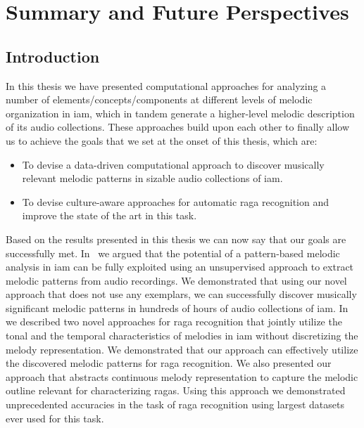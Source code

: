 
\chapter{Summary and Future Perspectives}
\label{sec:summary_future_work}

\section{Introduction}
\label{sec:summary_thesis}

In this thesis we have presented computational approaches for analyzing a number of elements/concepts/components at different levels of melodic organization in \gls{iam}, which in tandem generate a higher-level melodic description of its audio collections. These approaches build upon each other to finally allow us to achieve the goals that we set at the onset of this thesis, which are: 

\begin{itemize}
	\item To devise a data-driven computational approach to discover musically relevant melodic patterns in sizable audio collections of \gls{iam}.
	\item To devise culture-aware approaches for automatic \gls{raga} recognition and improve the state of the art in this task. 
\end{itemize}

Based on the results presented in this thesis we can now say that our goals are successfully met. In~ we argued that the potential of a pattern-based melodic analysis in \gls{iam} can be fully exploited using an unsupervised approach to extract melodic patterns from audio recordings. We demonstrated that using our novel approach that does not use any exemplars, we can successfully discover musically significant melodic patterns in hundreds of hours of audio collections of \gls{iam}. In~ we described two novel approaches for \gls{raga} recognition that jointly utilize the tonal and the temporal characteristics of melodies in \gls{iam} without discretizing the melody representation. We demonstrated that our approach can effectively utilize the discovered melodic patterns for \gls{raga} recognition. We also presented our approach that abstracts continuous melody representation to capture the melodic outline relevant for characterizing \glspl{raga}. Using this approach we demonstrated unprecedented accuracies in the task of \gls{raga} recognition using largest datasets ever used for this task. 

